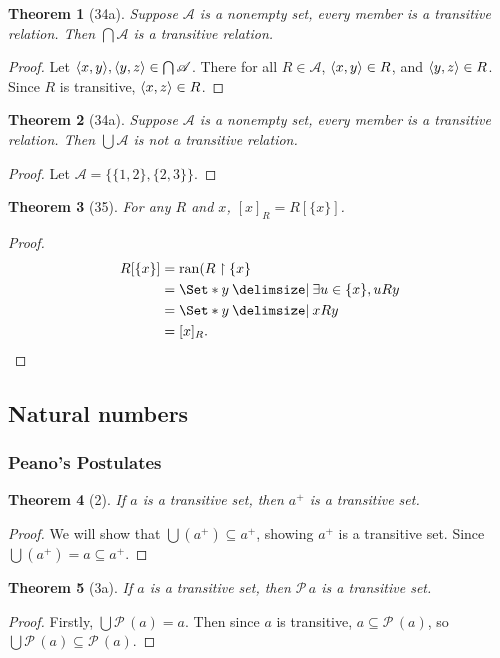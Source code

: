 \documentclass[12pt]{article}
\theoremstyle{plain}
\newtheorem*{exthm}{Theorem}
\theoremstyle{remark}
\theoremstyle{definition}
\theoremstyle{remark}
\newcommand{\powerset}{\mathscr{P}\,}
\providecommand\st{}
\newcommand\SetSymbol[1][]{%
  \nonscript\:#1\vert%
  \allowbreak%
  \nonscript\:
\mathopen{}}
\DeclarePairedDelimiter{\ang}{\langle}{\rangle}
\renewcommand\st{\SetSymbol[\delimsize]}
\DeclareMathOperator{\ran}{ran}
\begin{document}
\begin{exthm}[34a]
  Suppose $\mathscr{A}$ is a nonempty set, every member is a transitive relation. Then $\bigcap \mathscr{A}$ is a transitive relation.
\end{exthm}
\begin{proof}
  Let $\ang{x,y}, \ang{y,z} \in \bigcap \mathscr{A}$. There for all $R \in \mathscr{A}$, $\ang{x,y} \in R$, and $\ang{y,z} \in R$. Since $R$ is transitive, $\ang{x, z} \in R$.
\end{proof}

\begin{exthm}[34a]
  Suppose $\mathscr{A}$ is a nonempty set, every member is a transitive relation. Then $\bigcup \mathscr{A}$ is not a transitive relation.
\end{exthm}
\begin{proof}
  Let $\mathscr{A} = \{\{1, 2\}, \{2, 3\}\}$.
\end{proof}

\begin{exthm}[35]
  For any $R$ and $x$, $[x]_R = R[\{x\}]$.
\end{exthm}
\begin{proof}
  \begin{align*}
    R[\{x\}] &= \ran(R \restriction \{x\}\\
             &= \Set*{y \st \exists u \in \{x\}, uRy}\\
             &= \Set*{y \st xRy}\\
             &= [x]_R.
  \end{align*}
\end{proof}

\subsection{Natural numbers}
\subsubsection{Peano's Postulates}
\begin{exthm}[2]
  If $a$ is a transitive set, then $a^+$ is a transitive set.
\end{exthm}
\begin{proof}
  We will show that $\bigcup (a^+) \subseteq a^+$, showing $a^+$ is a transitive set. Since $\bigcup (a^+) = a \subseteq a^+$.
\end{proof}

\begin{exthm}[3a]
  If $a$ is a transitive set, then $\powerset a$ is a transitive set.
\end{exthm}
\begin{proof}
  Firstly, $\bigcup \powerset(a) = a$. Then since $a$ is transitive, $a \subseteq \powerset(a)$, so $\bigcup \powerset(a) \subseteq \powerset(a)$.
\end{proof}
\end{document}
